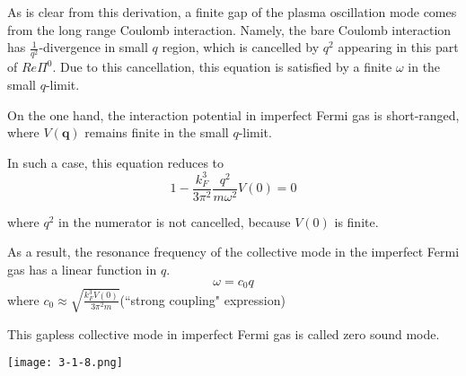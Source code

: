As is clear from this derivation, a finite gap of the plasma oscillation mode comes from the long range Coulomb interaction. Namely, the bare Coulomb interaction has $\frac{1}{q^2}$-divergence in small $q$ region, which is cancelled by $q^2$ appearing in this part of $Re \Pi^0$. Due to this cancellation, this equation is satisfied by a finite $\omega$ in the small $q$-limit.

On the one hand, the interaction potential in imperfect Fermi gas is short-ranged, where $V(\mathbf{q})$ remains finite in the small $q$-limit.

In such a case, this equation reduces to
\begin{equation} \label{Eqs3.2.14}
1 - \frac{k_F^3}{3\pi^2} \frac{q^2}{m\omega^2} V(0) = 0
\end{equation}

where $q^2$ in the numerator is not cancelled, because $V(0)$ is finite.

As a result, the resonance frequency of the collective mode in the imperfect Fermi gas has a linear function in $q$.
\begin{equation} \label{Eqs3.2.15}
\omega = c_0 q
\end{equation}
where $c_0 \approx \sqrt{\frac{k_F^3V(0)}{3\pi^2 m}}$(``strong coupling" expression)

This gapless collective mode in imperfect Fermi gas is called zero sound mode.

\begin{center} \label{Fig3.1.8}
\texttt{[image: 3-1-8.png]}
\end{center}
